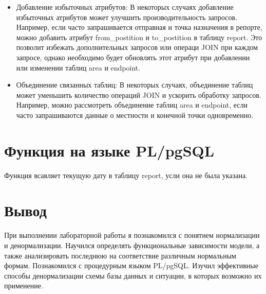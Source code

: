 \documentclass{article}
\begin{document}
\begin{itemize}
  \item Добавление избыточных атрибутов: В некоторых случаях добавление избыточных атрибутов может улучшить производительность запросов. Например, если часто запрашивается отправная и точка назначения в репорте, можно добавить атрибут from\_postition и to\_postition в таблицу report. Это позволит избежать дополнительных запросов или операци JOIN при каждом запросе, однако необходимо будет обновлять этот атрибут при добавлении или изменении таблиц area и endpoint.
        
  \item Объединение связанных таблиц: В некоторых случаях, объединение таблиц может уменьшить количество операций JOIN и ускорить обработку запросов. Например, можно рассмотреть объединение таблиц area и endpoint, если часто запрашиваются данные о местности и конечной точки одновременно.
\end{itemize}


\section{Функция на языке PL/pgSQL}

Функция всавляет текущую дату в таблицу report, усли она не была указана.

\section{Вывод}
При выполнении лабораторной работы я познакомился с понятием нормализации и денормализации. Научился определять функциональные зависимости модели, а также анализировать последнюю на соответствие различным нормальным формам. Познакомился с процедурным языком PL/pgSQL. Изучил эффективные способы денормализации схемы базы данных и ситуации, в которых возможно их применение.
\end{document}
